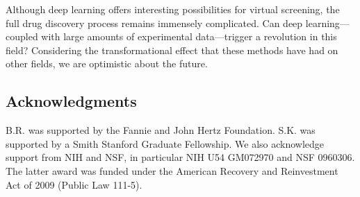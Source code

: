 Although deep learning offers interesting possibilities for virtual
screening, the full drug discovery process remains immensely complicated.
Can deep learning---coupled with large amounts of experimental
data---trigger a revolution in this field? Considering the transformational
effect that these methods have had on other fields, we are optimistic about
the future.

\subsection*{Acknowledgments} B.R. was supported by the Fannie and John Hertz
Foundation. S.K. was supported by a Smith Stanford Graduate Fellowship.
We also acknowledge support from NIH and NSF, in particular NIH U54
GM072970 and NSF 0960306. The latter award was funded under the American
Recovery and Reinvestment Act of 2009 (Public Law 111-5).

%
%
%